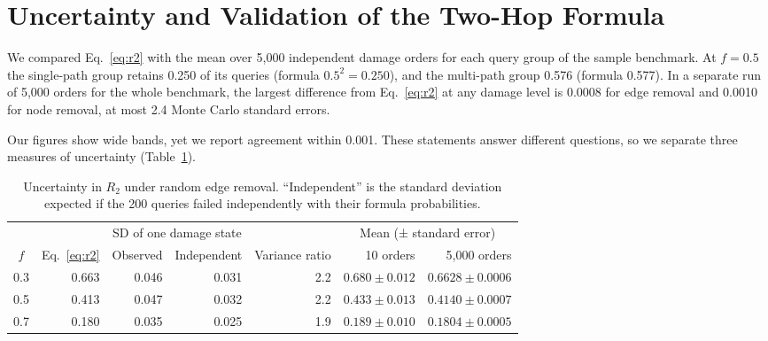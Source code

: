 \section{Uncertainty and Validation of the Two-Hop Formula}
\label{app:uncertainty}
\label{sec:blind-uncertainty}

We compared Eq.~\eqref{eq:r2} with the mean over 5,000 independent damage orders
for each query group of the sample benchmark. At
$f=0.5$ the single-path group retains 0.250 of its queries (formula
$0.5^2=0.250$), and the multi-path group 0.576 (formula 0.577). In a separate run
of 5,000 orders for the whole benchmark, the largest difference from
Eq.~\eqref{eq:r2} at any damage level is 0.0008 for edge removal and 0.0010 for
node removal, at most 2.4 Monte Carlo standard errors.




Our figures show wide bands, yet we report agreement within 0.001. These
statements answer different questions, so we separate three measures of
uncertainty (Table~\ref{tab:uncertainty}).

\begin{table}[!htbp]
\centering
\small
\caption{Uncertainty in $R_2$ under random edge removal. ``Independent'' is the
standard deviation expected if the 200 queries failed independently with their
formula probabilities.}
\label{tab:uncertainty}
\begin{tabular}{@{}crrrrrr@{}}
\toprule
& & \multicolumn{2}{c}{SD of one damage state} & & \multicolumn{2}{c}{Mean (± standard error)} \\
\cmidrule(lr){3-4}\cmidrule(lr){6-7}
$f$ & Eq.~\eqref{eq:r2} & Observed & Independent & Variance ratio & 10 orders & 5,000 orders \\
\midrule
0.3 & 0.663 & 0.046 & 0.031 & 2.2 & $0.680 \pm 0.012$ & $0.6628 \pm 0.0006$ \\
0.5 & 0.413 & 0.047 & 0.032 & 2.2 & $0.433 \pm 0.013$ & $0.4140 \pm 0.0007$ \\
0.7 & 0.180 & 0.035 & 0.025 & 1.9 & $0.189 \pm 0.010$ & $0.1804 \pm 0.0005$ \\
\bottomrule
\end{tabular}
\end{table}

